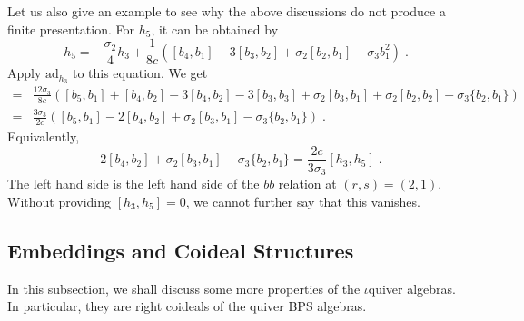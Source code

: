 \documentclass[11pt]{article}
\numberwithin{equation}{section}
\numberwithin{figure}{section}
\numberwithin{table}{section}
\begin{document}
Let us also give an example to see why the above discussions do not produce a finite presentation. For $h_5$, it can be obtained by
\begin{equation}
	h_5=-\frac{\sigma_2}{4}h_3+\frac{1}{8c}\left([b_4,b_1]-3[b_3,b_2]+\sigma_2[b_2,b_1]-\sigma_3b_1^2\right)\;.
\end{equation}
Apply $\mathrm{ad}_{h_3}$ to this equation. We get
\begin{align}
	[h_3,h_5]=&\frac{12\sigma_3}{8c}\left([b_5,b_1]+[b_4,b_2]-3[b_4,b_2]-3[b_3,b_3]+\sigma_2[b_3,b_1]+\sigma_2[b_2,b_2]-\sigma_3\{b_2,b_1\}\right)\nonumber\\
	=&\frac{3\sigma_3}{2c}\left([b_5,b_1]-2[b_4,b_2]+\sigma_2[b_3,b_1]-\sigma_3\{b_2,b_1\}\right)\;.
\end{align}
Equivalently,
\begin{equation}
	[b_5,b_1]-2[b_4,b_2]+\sigma_2[b_3,b_1]-\sigma_3\{b_2,b_1\}=\frac{2c}{3\sigma_3}[h_3,h_5]\;.
\end{equation}
The left hand side is the left hand side of the $bb$ relation at $(r,s)=(2,1)$. Without providing $[h_3,h_5]=0$, we cannot further say that this vanishes.

\subsection{Embeddings and Coideal Structures}\label{coideals}
In this subsection, we shall discuss some more properties of the $\iota$quiver algebras. In particular, they are right coideals of the quiver BPS algebras.
\end{document}
